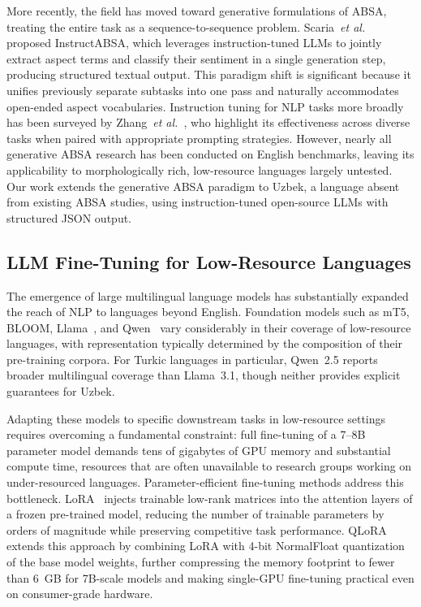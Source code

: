 \documentclass[runningheads]{llncs}
\newcommand{\etal}{\textit{et al.}}
\begin{document}
More recently, the field has moved toward generative formulations of ABSA, treating the entire task as a sequence-to-sequence problem. Scaria~\etal~\cite{scaria-etal-2024-instructabsa} proposed InstructABSA, which leverages instruction-tuned LLMs to jointly extract aspect terms and classify their sentiment in a single generation step, producing structured textual output. This paradigm shift is significant because it unifies previously separate subtasks into one pass and naturally accommodates open-ended aspect vocabularies. Instruction tuning for NLP tasks more broadly has been surveyed by Zhang~\etal~\cite{10.1145/3777411}, who highlight its effectiveness across diverse tasks when paired with appropriate prompting strategies. However, nearly all generative ABSA research has been conducted on English benchmarks, leaving its applicability to morphologically rich, low-resource languages largely untested. Our work extends the generative ABSA paradigm to Uzbek, a language absent from existing ABSA studies, using instruction-tuned open-source LLMs with structured JSON output.

\subsection{LLM Fine-Tuning for Low-Resource Languages}
\label{sec:rw_lowresource}

The emergence of large multilingual language models has substantially expanded the reach of NLP to languages beyond English. Foundation models such as mT5, BLOOM, Llama~\cite{Touvron2023-lf,Grattafiori2024-ka}, and Qwen~\cite{Qwen2024-kr} vary considerably in their coverage of low-resource languages, with representation typically determined by the composition of their pre-training corpora. For Turkic languages in particular, Qwen~2.5 reports broader multilingual coverage than Llama~3.1, though neither provides explicit guarantees for Uzbek.

Adapting these models to specific downstream tasks in low-resource settings requires overcoming a fundamental constraint: full fine-tuning of a 7--8B parameter model demands tens of gigabytes of GPU memory and substantial compute time, resources that are often unavailable to research groups working on under-resourced languages. Parameter-efficient fine-tuning methods address this bottleneck. LoRA~\cite{10.5555/3666122.3666563} injects trainable low-rank matrices into the attention layers of a frozen pre-trained model, reducing the number of trainable parameters by orders of magnitude while preserving competitive task performance. QLoRA~\cite{10.5555/3666122.3666563} extends this approach by combining LoRA with 4-bit NormalFloat quantization of the base model weights, further compressing the memory footprint to fewer than 6~GB for 7B-scale models and making single-GPU fine-tuning practical even on consumer-grade hardware.
\end{document}
